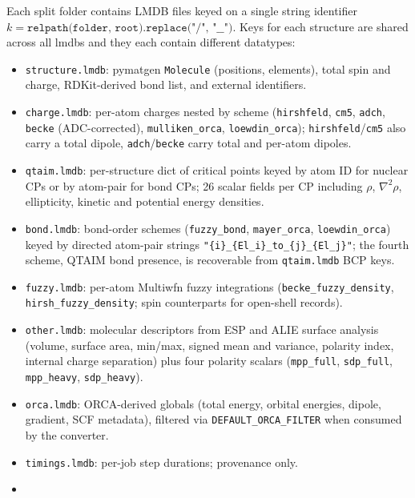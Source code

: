 Each split folder contains  LMDB files keyed on a single string identifier
$k = \texttt{relpath(folder, root).replace("/", "\_\_")}$. Keys for each structure
are shared across all lmdbs and they each contain different datatypes:
\begin{itemize}
\item \texttt{structure.lmdb}: pymatgen \texttt{Molecule} (positions, elements), total spin and charge, RDKit-derived bond list, and external identifiers.
\item \texttt{charge.lmdb}: per-atom charges nested by scheme (\texttt{hirshfeld}, \texttt{cm5}, \texttt{adch}, \texttt{becke} (ADC-corrected), \texttt{mulliken\_orca}, \texttt{loewdin\_orca}); \texttt{hirshfeld}/\texttt{cm5} also carry a total dipole, \texttt{adch}/\texttt{becke} carry total and per-atom dipoles.
\item \texttt{qtaim.lmdb}: per-structure dict of critical points keyed by atom ID for nuclear CPs or by atom-pair for bond CPs; 26 scalar fields per CP including $\rho$, $\nabla^{2}\rho$, ellipticity, kinetic and potential energy densities.
\item \texttt{bond.lmdb}: bond-order schemes (\texttt{fuzzy\_bond}, \texttt{mayer\_orca}, \texttt{loewdin\_orca}) keyed by directed atom-pair strings \texttt{"\{i\}\_\{El\_i\}\_to\_\{j\}\_\{El\_j\}"}; the fourth scheme, QTAIM bond presence, is recoverable from \texttt{qtaim.lmdb} BCP keys.
\item \texttt{fuzzy.lmdb}: per-atom Multiwfn fuzzy integrations (\texttt{becke\_fuzzy\_density}, \texttt{hirsh\_fuzzy\_density}; spin counterparts for open-shell records).
\item \texttt{other.lmdb}: molecular descriptors from ESP and ALIE surface analysis (volume, surface area, min/max, signed mean and variance, polarity index, internal charge separation) plus four polarity scalars (\texttt{mpp\_full}, \texttt{sdp\_full}, \texttt{mpp\_heavy}, \texttt{sdp\_heavy}).
\item \texttt{orca.lmdb}: ORCA-derived globals (total energy, orbital energies, dipole, gradient, SCF metadata), filtered via \texttt{DEFAULT\_ORCA\_FILTER} when consumed by the converter.
\item \texttt{timings.lmdb}: per-job step durations; provenance only.
\item {}
\end{itemize}


